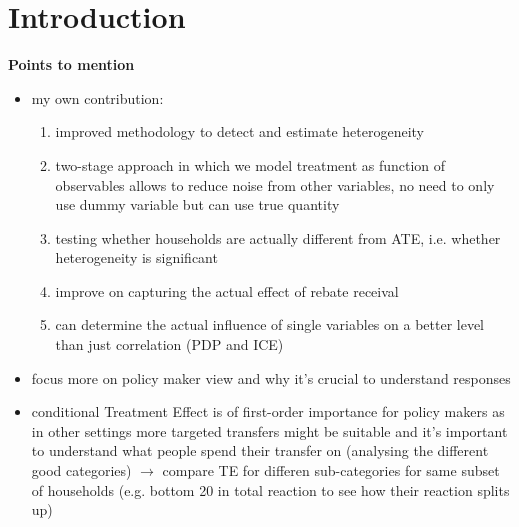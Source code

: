 \section{Introduction} \label{sec:intro}
\textbf{Points to mention}
\begin{itemize}
    \item my own contribution: 
    \begin{enumerate}
        \item improved methodology to detect and estimate heterogeneity 
        \item two-stage approach in which we model treatment as function of observables allows to reduce noise from other variables, no need to only use dummy variable but can use true quantity 
        \item testing whether households are actually different from ATE, i.e. whether heterogeneity is significant 
        \item improve on capturing the actual effect of rebate receival
        \item can determine the actual influence of single variables on a better level than just correlation (PDP and ICE)
    \end{enumerate}
    \item focus more on policy maker view and why it's crucial to understand responses
    \item conditional Treatment Effect is of first-order importance for policy makers as in other settings more targeted transfers might be suitable and it's important to understand what people spend their transfer on (analysing the different good categories) $\rightarrow$ compare TE for differen sub-categories for same subset of households (e.g. bottom 20 in total reaction to see how their reaction splits up)
\end{itemize}

